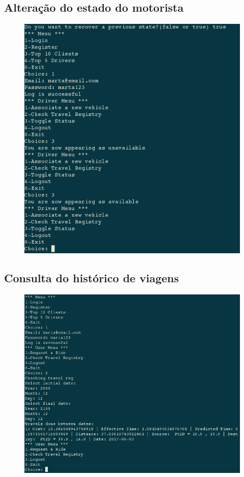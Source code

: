 \documentclass[a4paper,10pt,portuguese]{article}
\begin{document}
\subsection{Alteração do estado do motorista}
\begin{figure}[H]
    \centering
    \includegraphics[width=120mm]{mudarEstado.png}
\end{figure}


\subsection{Consulta do histórico de viagens}
\begin{figure}[H]
    \centering
    \includegraphics[width=120mm]{verViagens.png}
\end{figure}
\end{document}
